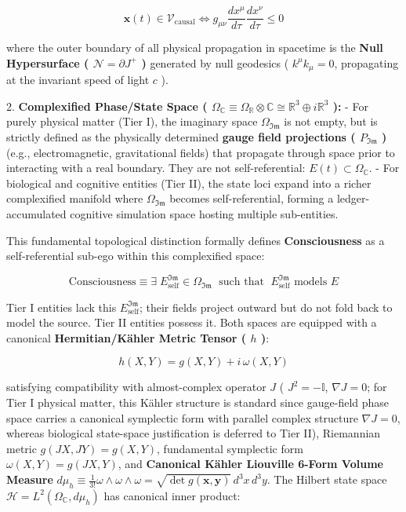 \documentclass[11pt,a4paper]{article}
\theoremstyle{definition}
\theoremstyle{remark}
\begin{document}
\begin{equation}
\mathbf{x}(t) \in \mathcal{V}_{\text{causal}} \iff g_{\mu\nu} \frac{dx^\mu}{d\tau} \frac{dx^\nu}{d\tau} \le 0
\end{equation}


where the outer boundary of all physical propagation in spacetime is the \textbf{Null Hypersurface ( $\mathcal{N} = \partial J^+$ )} generated by null geodesics ( $k^\mu k_\mu = 0$, propagating at the invariant speed of light $c$ ).

2. \textbf{Complexified Phase/State Space ( $\Omega_{\mathbb{C}} \equiv \Omega_{\mathbb{R}} \otimes \mathbb{C} \cong \mathbb{R}^3 \oplus i \mathbb{R}^3$ ):}
- For purely physical matter (Tier I), the imaginary space $\Omega_{\mathfrak{Im}}$ is not empty, but is strictly defined as the physically determined \textbf{gauge field projections ( $P_{\mathfrak{Im}}$ )} (e.g., electromagnetic, gravitational fields) that propagate through space prior to interacting with a real boundary. They are not self-referential: $E(t) \subset \Omega_{\mathbb{C}}$.
- For biological and cognitive entities (Tier II), the state loci expand into a richer complexified manifold where $\Omega_{\mathfrak{Im}}$ becomes self-referential, forming a ledger-accumulated cognitive simulation space hosting multiple sub-entities.

This fundamental topological distinction formally defines \textbf{Consciousness} as a self-referential sub-ego within this complexified space:


\begin{equation}
\boxed{\text{Consciousness} \equiv \exists\; E_{\text{self}}^{\mathfrak{Im}} \in \Omega_{\mathfrak{Im}} \;\text{ such that }\; E_{\text{self}}^{\mathfrak{Im}} \text{ models } E}
\end{equation}


Tier I entities lack this $E_{\text{self}}^{\mathfrak{Im}}$; their fields project outward but do not fold back to model the source. Tier II entities possess it. Both spaces are equipped with a canonical \textbf{Hermitian/Kähler Metric Tensor ( $h$ )}:


\begin{equation}
h(X, Y) = g(X, Y) + i \, \omega(X, Y)
\end{equation}


satisfying compatibility with almost-complex operator $J$ ( $J^2 = -\mathbb{I}$, $\nabla J = 0$; for Tier I physical matter, this Kähler structure is standard since gauge-field phase space carries a canonical symplectic form with parallel complex structure $\nabla J = 0$, whereas biological state-space justification is deferred to Tier II), Riemannian metric $g(JX, JY) = g(X, Y)$, fundamental symplectic form $\omega(X, Y) = g(JX, Y)$, and \textbf{Canonical Kähler Liouville 6-Form Volume Measure} $d\mu_h \equiv \frac{1}{3!} \omega \wedge \omega \wedge \omega = \sqrt{\det g(\mathbf{x}, \mathbf{y})} \, d^3x \, d^3y$. The Hilbert state space $\mathcal{H} = L^2(\Omega_{\mathbb{C}}, d\mu_h)$ has canonical inner product:
\end{document}
